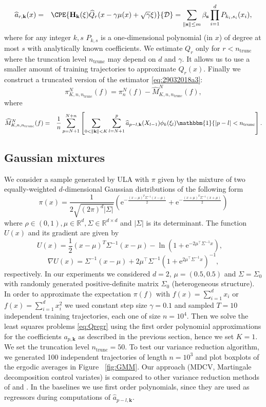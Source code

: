 \documentclass[bj]{imsart}
\def\rset{\mathbb{R}}
\def\rme{\mathrm{e}}
\def\rset{\mathbb{R}}
\def\NtrainPath{T}
\def\TrainSet{\mathcal{D}}
\begin{document}
\begin{eqnarray*}
\widehat a_{r,\mathbf{k}} (x) &=&\CPE{\mathbf{H}_\mathbf{k}(\xi) \widehat{Q}_{r}(x - \gamma \mu(x) + \sqrt{\gamma}\xi)}{\TrainSet}
= \sum_{\|\mathbf{s}\|\leq m} \beta_{\mathbf{s}} \prod_{i=1}^d P_{k_i,s_i}(x_i),
\end{eqnarray*}
where for any integer $k,s$ $P_{k,s}$ 
is a one-dimensional polynomial (in \(x\)) of degree at most \(s\) with analytically known coefficients. We estimate $Q_{r}$ only for $r < n_{\mathrm{trunc}}$ where the truncation level \(n_{\mathrm{trunc}}\) may depend on \(d\) and \(\gamma.\) It allows us to use a smaller amount of training trajectories to approximate $Q_{r}(x)$.
Finally  we construct a truncated version of the estimator \eqref{eq:29032018a3}:
\[
\pi_{K,n,n_{\mathrm{trunc}}}^N(f) = \pi_n^N(f) -  \widehat M_{K,n, n_{\mathrm{trunc}}}^{N}(f),
\]
where
\begin{eqnarray*}
\widehat M_{K,n,n_{\mathrm{trunc}}}^N(f) &=&\frac{1}{n}\sum_{p=N+1}^{N+n}\left[\sum_{0 < \|\mathbf{k}\| < K}\sum_{l=N+1}^{p} \widehat a_{p-l,\mathbf{k}}(X_{l-1})\phi_k(\xi_{l})\mathbbm{1}\{ | p-l | < n_{\mathrm{trunc}}\right].
\end{eqnarray*}

\subsection{Gaussian mixtures}
 We consider a sample generated by ULA with $\pi$  given by the mixture of two equally-weighted $d$-dimensional Gaussian distributions of the following form
 \[
 \pi(x) = \frac{1}{2\sqrt{(2\pi)^{d}|\Sigma|}} \left( \rme^{-\frac{(x-\mu)^T\Sigma^{-1}(x-\mu)}{2}} + \rme^{-\frac{(x+\mu)^T\Sigma^{-1}(x+\mu)}{2}}\right)
 \]
where $\rho \in (0,1), \mu \in \rset^d, \Sigma \in \rset^{d \times d}$ and $|\Sigma|$ is its determinant. The function $U(x)$ and its gradient are given by
\[
U(x) = \frac{1}{2}(x-\mu)^T\Sigma^{-1}(x-\mu) - \ln{\left(1 + \rme^{-2\mu^\top \Sigma^{-1}x}\right)}, \quad
\]
\[
\nabla U(x) = \Sigma^{-1}(x-\mu) +2\mu^\top\Sigma^{-1}\left(1 + \rme^{2 \mu^\top\Sigma^{-1} x}\right)^{-1},
\]
respectively.
In our experiments we considered $d = 2$, $\mu = \left(0.5,0.5\right)$ and $\Sigma = \Sigma_0$ with randomly generated positive-definite matrix $\Sigma_0$ (heterogeneous structure). In order to approximate the expectation \(\pi(f)\) with \(f(x)=\sum_{i=1}^d x_i\) or \(f(x) = \sum_{i=1}^d x^2_i\) we used constant step size $\gamma=0.1$ and sampled $\NtrainPath = 10$ independent training trajectories, each one of size $n = 10^4$.  Then we solve the least squares  problems \eqref{eq:Qregr} using the first order polynomial approximations for the coefficients \(a_{p,\mathbf{k}}\) as described in the previous section, hence we set $K = 1$. We set the truncation level \(n_{\mathrm{trunc}} = 50\). To test our variance reduction algorithm, we generated 100 independent trajectories of length $n = 10^3$ and plot boxplots of the ergodic averages in Figure ~\ref{fig:GMM}. Our approach (MDCV, Martingale decomposition control variates) is compared to other variance reduction methods of \cite{mira2013zero} and \cite{belomestny2019esvm}. In the baselines we use first order polynomials, since they are used as regressors during computations of $\hat{a}_{p-l,\mathbf{k}}$.
\end{document}
